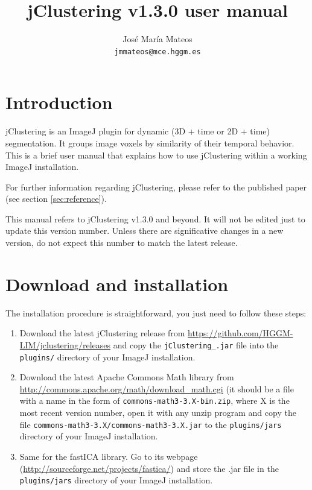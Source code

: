 \documentclass[11pt]{article} %
\title{jClustering v1.3.0 user manual}
\author{José María Mateos \\ \texttt{jmmateos@mce.hggm.es}}
\begin{document}
\maketitle

\tableofcontents

\section{Introduction}

jClustering is an ImageJ plugin for dynamic (3D + time or 2D + time) segmentation. It groups
image voxels by similarity of their temporal behavior. This is a brief user manual that explains
how to use jClustering within a working ImageJ installation.

For further information regarding jClustering, please refer to the published paper (see section \ref{sec:reference}).

This manual refers to jClustering v1.3.0 and beyond. It will not be edited just to update this version number. Unless
there are significative changes in a new version, do not expect this number to match the latest release.

\section{Download and installation}

The installation procedure is straightforward, you just need to follow these steps:

\begin{enumerate}
\item Download the latest jClustering release from \url{https://github.com/HGGM-LIM/jclustering/releases} and copy the 
\texttt{jClustering\_.jar} file into the \texttt{plugins/} directory of your ImageJ installation.

\item Download the latest Apache Commons Math library from \url{http://commons.apache.org/math/download_math.cgi}
(it should be a file with a name in the form of \texttt{commons-math3-3.X-bin.zip}, where X is the most recent version number,
open it with any unzip program and copy the file \texttt{commons-math3-3.X/commons-math3-3.X.jar} to the 
\texttt{plugins/jars} directory of your ImageJ installation.

\item Same for the fastICA library. Go to its webpage (\url{http://sourceforge.net/projects/fastica/}) and store the .jar file
in the \texttt{plugins/jars} directory of your ImageJ installation.
\end{enumerate}
\end{document}
